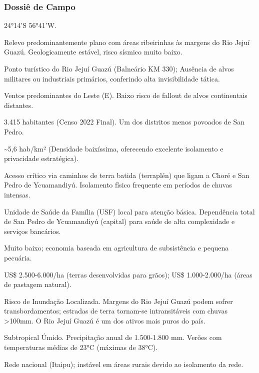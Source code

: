 \subsubsection{Dossiê de Campo}
\begin{description}[style=nextline,leftmargin=0.5cm,font=\bfseries]
\item[Coordenadas]  24°14'S 56°41'W.
\item[Topografia]  Relevo predominantemente plano com áreas ribeirinhas às margens do Rio Jejuí Guazú. Geologicamente estável, risco sísmico muito baixo.
\item[Alvos Estratégicos]  Ponto turístico do Rio Jejuí Guazú (Balneário KM 330); Ausência de alvos militares ou industriais primários, conferindo alta invisibilidade tática.
\item[Fallout]  Ventos predominantes do Leste (E). Baixo risco de fallout de alvos continentais distantes.
\item[População]  3.415 habitantes (Censo 2022 Final). Um dos distritos menos povoados de San Pedro.
\item[Densidade]  \textasciitilde 5,6 hab/\allowbreak km² (Densidade baixíssima, oferecendo excelente isolamento e privacidade estratégica).
\item[Vias de Acesso]  Acesso crítico via caminhos de terra batida (terraplén) que ligam a Choré e San Pedro de Ycuamandiyú. Isolamento físico frequente em períodos de chuvas intensas.
\item[Serviços]  Unidade de Saúde da Família (USF) local para atenção básica. Dependência total de San Pedro de Ycuamandiyú (capital) para saúde de alta complexidade e serviços bancários.
\item[Custo de Vida]  Muito baixo; economia baseada em agricultura de subsistência e pequena pecuária.
\item[Preço da Terra]  US\$ 2.500-6.000/\allowbreak ha (terras desenvolvidas para grãos); US\$ 1.000-2.000/\allowbreak ha (áreas de pastagem natural).
\item[Hidrologia]  Risco de Inundação Localizada. Margens do Rio Jejuí Guazú podem sofrer transbordamentos; estradas de terra tornam-se intransitáveis com chuvas >100mm. O Rio Jejuí Guazú é um dos ativos mais puros do país.
\item[Clima]  Subtropical Úmido. Precipitação anual de 1.500-1.800 mm. Verões com temperaturas médias de 23°C (máximas de 38°C).
\item[Energia]  Rede nacional (Itaipu); instável em áreas rurais devido ao isolamento da rede.

\end{description}
